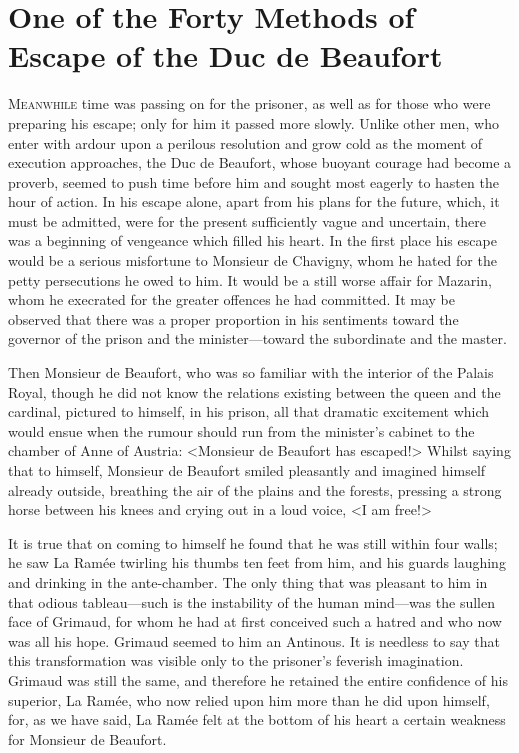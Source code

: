 \chapter[The Escape of the Duc de Beaufort]{One of the Forty Methods of Escape of the Duc de Beaufort}
 \lettrine{M}{eanwhile} time was passing on for the prisoner, as well as for those who were preparing his escape; only for him it passed more slowly. Unlike other men, who enter with ardour upon a perilous resolution and grow cold as the moment of execution approaches, the Duc de Beaufort, whose buoyant courage had become a proverb, seemed to push time before him and sought most eagerly to hasten the hour of action. In his escape alone, apart from his plans for the future, which, it must be admitted, were for the present sufficiently vague and uncertain, there was a beginning of vengeance which filled his heart. In the first place his escape would be a serious misfortune to Monsieur de Chavigny, whom he hated for the petty persecutions he owed to him. It would be a still worse affair for Mazarin, whom he execrated for the greater offences he had committed. It may be observed that there was a proper proportion in his sentiments toward the governor of the prison and the minister—toward the subordinate and the master.

Then Monsieur de Beaufort, who was so familiar with the interior of the Palais Royal, though he did not know the relations existing between the queen and the cardinal, pictured to himself, in his prison, all that dramatic excitement which would ensue when the rumour should run from the minister's cabinet to the chamber of Anne of Austria: <Monsieur de Beaufort has escaped!> Whilst saying that to himself, Monsieur de Beaufort smiled pleasantly and imagined himself already outside, breathing the air of the plains and the forests, pressing a strong horse between his knees and crying out in a loud voice, <I am free!>

It is true that on coming to himself he found that he was still within four walls; he saw La Ramée twirling his thumbs ten feet from him, and his guards laughing and drinking in the ante-chamber. The only thing that was pleasant to him in that odious tableau—such is the instability of the human mind—was the sullen face of Grimaud, for whom he had at first conceived such a hatred and who now was all his hope. Grimaud seemed to him an Antinous. It is needless to say that this transformation was visible only to the prisoner's feverish imagination. Grimaud was still the same, and therefore he retained the entire confidence of his superior, La Ramée, who now relied upon him more than he did upon himself, for, as we have said, La Ramée felt at the bottom of his heart a certain weakness for Monsieur de Beaufort.

